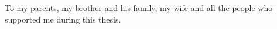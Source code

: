 
\begin{dedication} %
To my parents, my brother and his family, my wife and all the people who supported me during this thesis.

\end{dedication}

